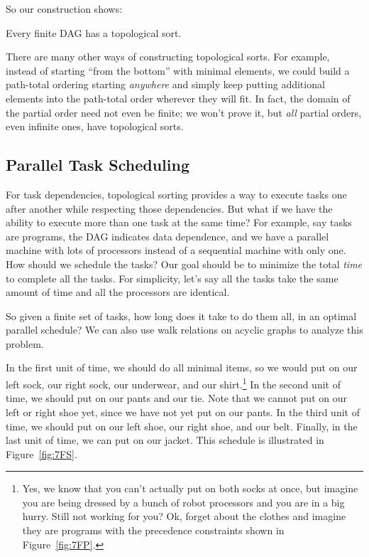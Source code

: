 So our construction shows:

\begin{theorem}\label{thm:topological}
Every finite DAG has a topological sort.
\end{theorem}
\begin{editingnotes}

There are many other ways of constructing topological sorts.  For example,
instead of starting ``from the bottom'' with minimal elements, we could
build a path-total ordering starting \emph{anywhere} and simply keep
putting additional elements into the path-total order wherever they will fit.
In fact, the domain of the partial order need not even be finite; we won't
prove it, but \emph{all} partial orders, even infinite ones, have
topological sorts.
\end{editingnotes}

\subsection{Parallel Task Scheduling}\label{parallel_sec}

For task dependencies, topological sorting provides a
way to execute tasks one after another while respecting those dependencies.
But what if we have the ability to execute more than one task at the same
time?  For example, say tasks are programs, the DAG indicates
data dependence, and we have a parallel machine with lots of processors
instead of a sequential machine with only one.  How should we schedule the
tasks?  Our goal should be to minimize the total \emph{time} to complete
all the tasks.  For simplicity, let's say all the tasks take the same
amount of time and all the processors are identical.

So given a finite set of tasks, how long does it take to do them all,
in an optimal parallel schedule?  We can also use walk relations on
acyclic graphs to analyze this problem.

In the first unit of time, we should do all minimal items, so we would
put on our left sock, our right sock, our underwear, and our
shirt.\footnote{Yes, we know that you can't actually put on both socks
  at once, but imagine you are being dressed by a bunch of robot
  processors and you are in a big hurry.  Still not working for you?
  Ok, forget about the clothes and imagine they are programs with the
  precedence constraints shown in Figure~\ref{fig:7FP}.}  In the
second unit of time, we should put on our pants and our tie.  Note
that we cannot put on our left or right shoe yet, since we have not
yet put on our pants.  In the third unit of time, we should put on our
left shoe, our right shoe, and our belt.  Finally, in the last unit of
time, we can put on our jacket.  This schedule is illustrated in
Figure~\ref{fig:7FS}.

